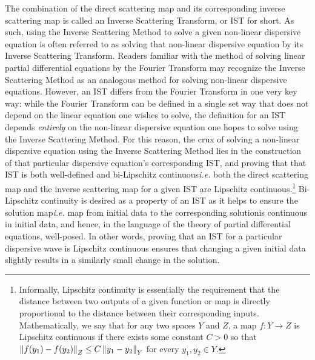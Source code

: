 \documentclass[../dissertation.tex]{subfiles}
\begin{document}
The combination of the direct scattering map and its corresponding inverse 
scattering map is called an 
Inverse Scattering Transform, or IST for short. As such, using the Inverse 
Scattering Method to solve a given non-linear dispersive equation is often 
referred to as solving that non-linear dispersive equation by its Inverse 
Scattering Transform. Readers familiar with the method of solving linear partial 
differential equations by the Fourier Transform may recognize the Inverse 
Scattering Method as an analogous method for solving non-linear dispersive 
equations. However, an IST differs from the Fourier Transform in one very 
key way: while the Fourier Transform can be defined in a single set way that 
does not depend on the linear equation one wishes to solve, the definition for 
an IST depends \textit{entirely} on the non-linear dispersive equation one hopes 
to solve using the Inverse Scattering Method. For this reason, the crux of 
solving a non-linear dispersive equation using the Inverse Scattering Method 
lies in the construction of that particular dispersive equation's 
corresponding IST, and proving that that IST is both well-defined and 
bi-Lipschitz continuous\textemdash{}\textit{i.e.} both the direct scattering map
and the inverse scattering map for a given IST are Lipschitz 
continuous.\footnote{Informally, Lipschitz continuity is essentially the requirement
that the distance between two outputs of a given function or map is directly 
proportional to the distance between their corresponding inputs. Mathematically,
we say that for any two spaces $Y$ and $Z$, a map $f : Y \to Z$ is Lipschitz 
continuous if there exists some constant $C>0$ so that 
$\left\| f(y_1) - f(y_2) \right\|_Z \leq C \left\| y_1 - y_2 \right\|_Y$ for every $y_1, y_2 \in Y$.}
Bi-Lipschitz continuity is desired as a property of an IST as it helps to ensure 
the solution map\textemdash{}\textit{i.e.} map from initial data to the 
corresponding solution\textemdash{}is continuous in initial data, and hence, 
in the language of the theory of partial differential equations, well-posed.
In other words, proving that an IST for a particular dispersive wave is 
Lipschitz continuous ensures that changing a given initial data slightly 
results in a similarly small change in the solution. 
\end{document}
